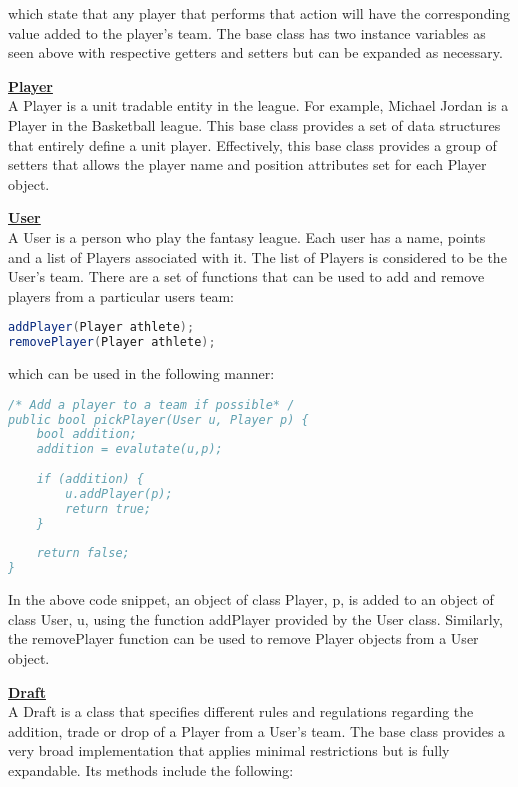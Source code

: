 \documentclass[12pt]{report}
\begin{document}
\begin{doublespace}
which state that any player that performs that action will have the corresponding value added to the player's team. The base class has two instance variables as seen above with respective getters and setters but can be expanded as necessary.

\textbf{\underline{Player}}
\\
A Player is a unit tradable entity in the league. For example, Michael Jordan is a Player in the Basketball league. This base class provides a set of data structures that entirely define a unit player.  Effectively, this base class provides a group of setters that allows the player name and position attributes set for each Player object.

\textbf{\underline{User}}
\\
A User is a person who play the fantasy league. Each user has a name, points and a list of Players associated with it. The list of Players is considered to be the User's team. There are a set of functions that can be used to add and remove players from a particular users team:
\end{doublespace}

\begin{lstlisting}[language=Java,label=some-code,caption=Action]
addPlayer(Player athlete);
removePlayer(Player athlete);
\end{lstlisting}

\begin{doublespace}
which can be used in the following manner:
\end{doublespace}

\begin{lstlisting}[language=Java,label=some-code,caption=Action]
/* Add a player to a team if possible* /
public bool pickPlayer(User u, Player p) {
	bool addition;
	addition = evalutate(u,p);
	
	if (addition) {
		u.addPlayer(p);
		return true;
	}
	
	return false;
}
\end{lstlisting}

\begin{doublespace}
In the above code snippet, an object of class Player, p, is added to an object of class User, u, using the function addPlayer provided by the User class. Similarly, the removePlayer function can be used to remove Player objects from a User object.

\textbf{\underline{Draft}}
\\
A Draft is a class that specifies different rules and regulations regarding the addition, trade or drop of a Player from a User's team. The base class provides a very broad implementation that applies minimal restrictions but is fully expandable. Its methods include the following:
\end{doublespace}
\end{document}
